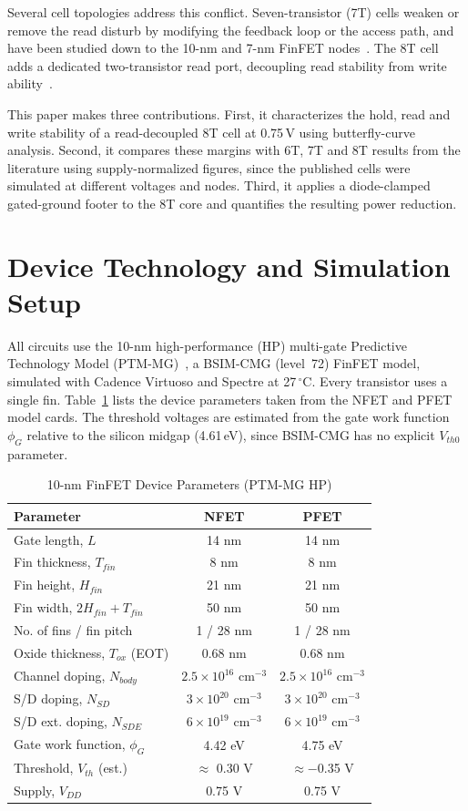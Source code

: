 \documentclass[conference]{IEEEtran}
\begin{document}
Several cell topologies address this conflict. Seven-transistor (7T) cells weaken or remove the read disturb by modifying the feedback loop or the access path, and have been studied down to the 10-nm and 7-nm FinFET nodes~\cite{ansari2015near7t,yang2016single7t}. The 8T cell adds a dedicated two-transistor read port, decoupling read stability from write ability~\cite{chang2005stable}.

This paper makes three contributions. First, it characterizes the hold, read and write stability of a read-decoupled 8T cell at 0.75\,V using butterfly-curve analysis. Second, it compares these margins with 6T, 7T and 8T results from the literature using supply-normalized figures, since the published cells were simulated at different voltages and nodes. Third, it applies a diode-clamped gated-ground footer to the 8T core and quantifies the resulting power reduction.

\section{Device Technology and Simulation Setup}
All circuits use the 10-nm high-performance (HP) multi-gate Predictive Technology Model (PTM-MG)~\cite{sinha2012ptm}, a BSIM-CMG (level~72) FinFET model, simulated with Cadence Virtuoso and Spectre at 27\,$^{\circ}$C. Every transistor uses a single fin. Table~\ref{tab:device} lists the device parameters taken from the NFET and PFET model cards. The threshold voltages are estimated from the gate work function $\phi_G$ relative to the silicon midgap (4.61\,eV), since BSIM-CMG has no explicit $V_{th0}$ parameter.

\begin{table}[t]
\caption{10-nm FinFET Device Parameters (PTM-MG HP)}
\label{tab:device}
\centering
\setlength{\tabcolsep}{3pt}\footnotesize
\begin{tabular}{lcc}
\toprule
\textbf{Parameter} & \textbf{NFET} & \textbf{PFET} \\
\midrule
Gate length, $L$ & 14 nm & 14 nm \\
Fin thickness, $T_{fin}$ & 8 nm & 8 nm \\
Fin height, $H_{fin}$ & 21 nm & 21 nm \\
Fin width, $2H_{fin}+T_{fin}$ & 50 nm & 50 nm \\
No. of fins / fin pitch & 1 / 28 nm & 1 / 28 nm \\
Oxide thickness, $T_{ox}$ (EOT) & 0.68 nm & 0.68 nm \\
Channel doping, $N_{body}$ & $2.5\times10^{16}$ cm$^{-3}$ & $2.5\times10^{16}$ cm$^{-3}$ \\
S/D doping, $N_{SD}$ & $3\times10^{20}$ cm$^{-3}$ & $3\times10^{20}$ cm$^{-3}$ \\
S/D ext. doping, $N_{SDE}$ & $6\times10^{19}$ cm$^{-3}$ & $6\times10^{19}$ cm$^{-3}$ \\
Gate work function, $\phi_G$ & 4.42 eV & 4.75 eV \\
Threshold, $V_{th}$ (est.) & $\approx$ 0.30 V & $\approx -$0.35 V \\
Supply, $V_{DD}$ & 0.75 V & 0.75 V \\
\bottomrule
\end{tabular}
\end{table}
\end{document}
